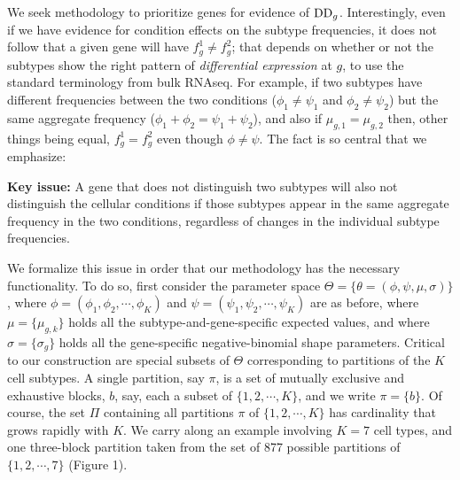 \documentclass[aoas,preprint]{imsart}
\begin{document}
We seek methodology to prioritize genes for evidence
of ${\rm DD}_g$.  Interestingly, even if we have evidence for condition effects
on the subtype frequencies, it does not follow that a given
gene will have $f^1_g \neq f^2_g$; that depends on whether or not the subtypes
show the right pattern of {\em differential expression} at $g$, to use the 
standard terminology from bulk RNAseq.  For example, if two subtypes have 
different frequencies between the two conditions ($\phi_1 \neq \psi_1$ and 
 $\phi_2 \neq \psi_2$) but the same aggregate frequency
($\phi_1+\phi_2 = \psi_1 + \psi_2$),  and also  if $\mu_{g,1} = \mu_{g,2}$
then, other things being equal, $f^1_g = f^2_g$ even though $\phi \neq \psi$. The fact
is so central that we emphasize:


\noindent
{\bf Key issue:} A gene that does not distinguish two subtypes will also not distinguish
the cellular conditions if those subtypes appear in the same aggregate frequency
in the two conditions, regardless of changes in the individual subtype 
frequencies. 

 We formalize this issue in order that our methodology
has the necessary functionality.  To do so,  first consider the parameter space 
$\Theta = \{ \theta=(\phi, \psi,\mu, \sigma)  \}$,
where $\phi=(\phi_1, \phi_2, \cdots, \phi_K)$ and $\psi=(\psi_1, \psi_2, \cdots, \psi_K)$ 
are as before, where $\mu = \{ \mu_{g,k} \}$ holds  all the subtype-and-gene-specific expected
values, and where $\sigma = \{ \sigma_g \}$ holds all the gene-specific negative-binomial
shape parameters.  Critical to our construction are special subsets of $\Theta$ corresponding
to partitions of the $K$ cell subtypes.  A single partition, say $\pi$, is a set of
mutually exclusive and exhaustive blocks, $b$, say, each a subset of $\{1, 2, 
\cdots, K\}$, and we write $\pi = \{ b \}$.  Of course,
the set $\Pi$ containing all partitions $\pi$ of $\{1,2, \cdots, K\}$
 has cardinality that grows rapidly with $K$. 
 We carry along an example
involving $K=7$ cell types, and one three-block partition taken
from the set of 877 possible partitions of $\{1, 2, \cdots, 7\}$ (Figure 1).
\end{document}
